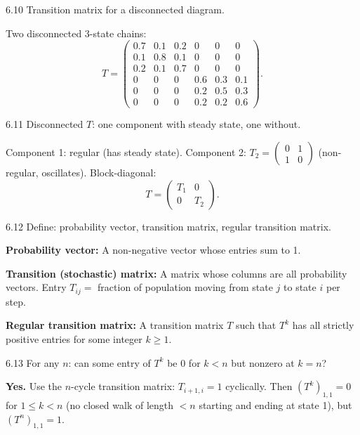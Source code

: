 \begin{exercise}{6.10}
Transition matrix for a disconnected diagram.
\end{exercise}
\begin{solution}
Two disconnected 3-state chains:
\[T=\begin{pmatrix}0.7&0.1&0.2&0&0&0\\0.1&0.8&0.1&0&0&0\\0.2&0.1&0.7&0&0&0\\0&0&0&0.6&0.3&0.1\\0&0&0&0.2&0.5&0.3\\0&0&0&0.2&0.2&0.6\end{pmatrix}.\]
\end{solution}

\begin{exercise}{6.11}
Disconnected $T$: one component with steady state, one without.
\end{exercise}
\begin{solution}
Component 1: regular (has steady state). Component 2: $T_2=\begin{pmatrix}0&1\\1&0\end{pmatrix}$ (non-regular, oscillates). Block-diagonal:
\[T=\begin{pmatrix}T_1&0\\0&T_2\end{pmatrix}.\]
\end{solution}

\begin{exercise}{6.12}
Define: probability vector, transition matrix, regular transition matrix.
\end{exercise}
\begin{solution}
\textbf{Probability vector:} A non-negative vector whose entries sum to 1.

\textbf{Transition (stochastic) matrix:} A matrix whose columns are all probability vectors. Entry $T_{ij}=$ fraction of population moving from state $j$ to state $i$ per step.

\textbf{Regular transition matrix:} A transition matrix $T$ such that $T^k$ has all strictly positive entries for some integer $k\geq1$.
\end{solution}

\begin{exercise}{6.13}
For any $n$: can some entry of $T^k$ be 0 for $k<n$ but nonzero at $k=n$?
\end{exercise}
\begin{solution}
\textbf{Yes.} Use the $n$-cycle transition matrix: $T_{i+1,i}=1$ cyclically. Then $(T^k)_{1,1}=0$ for $1\leq k<n$ (no closed walk of length $<n$ starting and ending at state 1), but $(T^n)_{1,1}=1$.
\end{solution}

